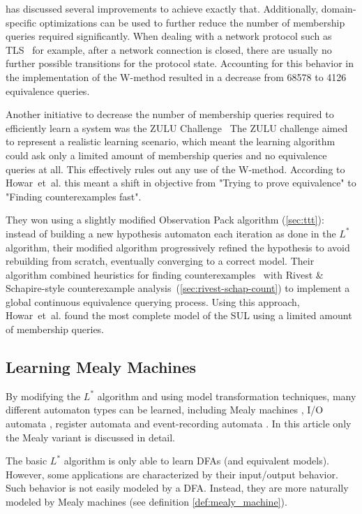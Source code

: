  has discussed several improvements to achieve exactly
that. Additionally, domain-specific optimizations can be used to further reduce
the number of membership queries required significantly.  When dealing with a
network protocol such as TLS~\cite{deRuiter2015} 
for example, after a network connection is closed, there are usually no further
possible transitions for the protocol state.  Accounting for this behavior in
the implementation of the W-method resulted in a decrease from 68578 to 4126
equivalence queries.

Another initiative to decrease the number of membership queries required
to efficiently learn a system was the ZULU Challenge~\cite{Howar2010b}
The ZULU challenge aimed to represent a realistic learning scenario,
which meant the learning algorithm could ask only a limited amount of
membership queries and no equivalence queries at all.
This effectively rules out any use of the W-method.
According to Howar~et~al. this meant a shift in objective from
"Trying to prove equivalence" to "Finding counterexamples fast".

They won using a slightly modified Observation Pack algorithm (\cref{sec:ttt}):
instead of building a new hypothesis automaton each iteration as done
in the $L^*$ algorithm, their modified algorithm progressively refined
the hypothesis to avoid rebuilding from scratch,
eventually converging to a correct model.
Their algorithm combined heuristics for finding
counterexamples~\cite{Howar2010b} with Rivest \& Schapire-style counterexample
analysis~(\cref{sec:rivest-schap-count}) to implement a global continuous
equivalence querying process.
Using this approach, Howar~et~al. found the most complete
model of the SUL using a limited amount of membership queries.

\subsection{Learning Mealy Machines}
\label{sec:learn-mealy-mach}

By modifying the $L^*$ algorithm and using model transformation techniques, many
different automaton types can be learned, including Mealy machines
\cite{Shahbaz2009}, I/O automata \cite{Aarts2010a}, register automata
\cite{Howar2012} and event-recording automata \cite{Grinchtein05}. In this
article only the Mealy variant is discussed in detail.

The basic $L^*$ algorithm is only able to learn DFAs (and equivalent
models). However, some applications are characterized by their input/output behavior.
Such behavior is not easily modeled by a DFA. Instead, they are more naturally
modeled by Mealy machines\cite{Shahbaz2009} (see definition
\ref{def:mealy_machine}).

